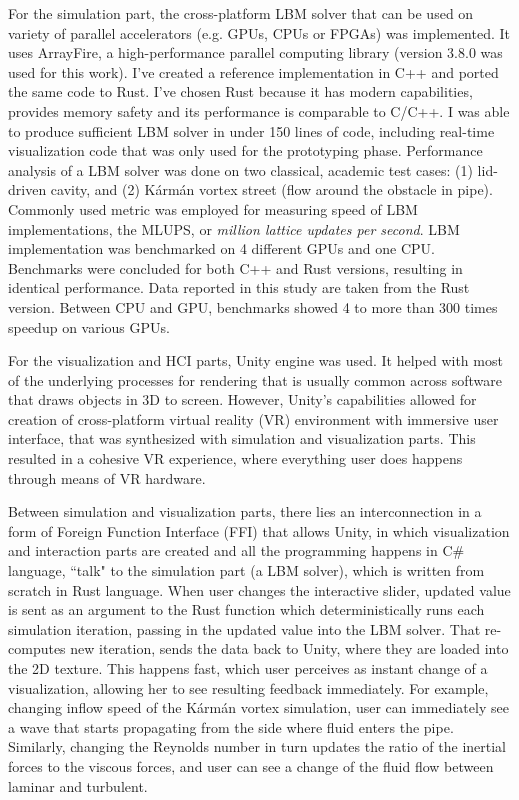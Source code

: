 For the simulation part, the cross-platform LBM solver that can be used on variety of parallel accelerators (e.g. GPUs, CPUs or FPGAs) was implemented. It uses ArrayFire, a high-performance parallel computing library (version 3.8.0 was used for this work). I've created a reference implementation in C++ and ported the same code to Rust. I've chosen Rust because it has modern capabilities, provides memory safety and its performance is comparable to C/C++. I was able to produce sufficient LBM solver in under 150 lines of code, including real-time visualization code that was only used for the prototyping phase. Performance analysis of a LBM solver was done on two classical, academic test cases: (1) lid-driven cavity, and (2) Kármán vortex street (flow around the obstacle in pipe). Commonly used metric was employed for measuring speed of LBM implementations, the MLUPS, or \emph{million lattice updates per second}. LBM implementation was benchmarked on 4 different GPUs and one CPU. Benchmarks were concluded for both C++ and Rust versions, resulting in identical performance. Data reported in this study are taken from the Rust version. Between CPU and GPU, benchmarks showed 4 to more than 300 times speedup on various GPUs.

For the visualization and HCI parts, Unity engine was used. It helped with most of the underlying processes for rendering that is usually common across software that draws objects in 3D to screen. However, Unity's capabilities allowed for creation of cross-platform virtual reality (VR) environment with immersive user interface, that was synthesized with simulation and visualization parts. This resulted in a cohesive VR experience, where everything user does happens through means of VR hardware. 

Between simulation and visualization parts, there lies an interconnection in a form of Foreign Function Interface (FFI) that allows Unity, in which visualization and interaction parts are created and all the programming happens in C\# language, ``talk" to the simulation part (a LBM solver), which is written from scratch in Rust language. When user changes the interactive slider, updated value is sent as an argument to the Rust function which deterministically runs each simulation iteration, passing in the updated value into the LBM solver. That re-computes new iteration, sends the data back to Unity, where they are loaded into the 2D texture. This happens fast, which user perceives as instant change of a visualization, allowing her to see resulting feedback immediately. For example, changing inflow speed of the Kármán vortex simulation, user can immediately see a wave that starts propagating from the side where fluid enters the pipe. Similarly, changing the Reynolds number in turn updates the ratio of the inertial forces to the viscous forces, and user can see a change of the fluid flow between laminar and turbulent.

